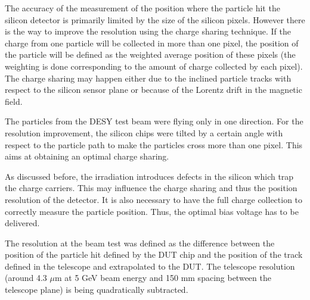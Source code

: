 The accuracy of the measurement of the position where the particle hit the silicon detector is primarily limited by the size of the silicon pixels.
However there is the way to improve the resolution using the charge sharing technique. If the charge from one particle will be collected in more
than one pixel, the position of the particle will be defined as the weighted average position of these pixels (the weighting is done corresponding 
to the amount of charge collected by each pixel). The charge sharing may happen either due to the inclined particle tracks with respect to the 
silicon sensor plane or because of the Lorentz drift in the magnetic field.

The particles from the DESY test beam were flying only in one direction. For the resolution improvement, the silicon chips were tilted by a certain 
angle with respect to the particle path to make the particles cross more than one pixel. This aims at obtaining an optimal charge sharing.

As discussed before, the irradiation introduces defects in the silicon which trap the charge carriers. This may influence the charge sharing
and thus the position resolution of the detector. It is also necessary to have the full charge collection to correctly measure the particle position.
Thus, the optimal bias voltage has to be delivered.

The resolution at the beam test was defined as the difference between the position of the particle hit defined by the DUT chip and the position of the
track defined in the telescope and extrapolated to the DUT. The telescope resolution (around 4.3 $\mu$m at 5 GeV beam energy and 150 mm spacing between
the telescope plane) is being quadratically subtracted.

